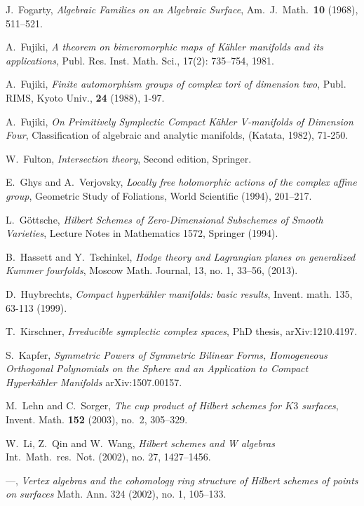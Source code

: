 \begin{thebibliography}{10}
J.~Fogarty, \emph{Algebraic Families on an Algebraic Surface},
  Am.~J.~Math.~\textbf{10} (1968), 511--521.

A.~Fujiki,
\emph{A theorem on bimeromorphic maps of K\"ahler manifolds and its applications},
Publ. Res. Inst. Math. Sci., 
17(2): 735--754, 1981.

A.~Fujiki, \emph{Finite automorphism groups of complex tori of dimension two}, Publ. RIMS,
  Kyoto Univ., \textbf{24} (1988), 1-97.

A.~Fujiki,
\emph{On Primitively Symplectic Compact K\"ahler V-manifolds of Dimension Four},
Classification of algebraic and analytic manifolds, 
(Katata, 1982), 71-250.

W.~Fulton,
\emph{Intersection theory},
Second edition, Springer.

E.~Ghys and A.~Verjovsky, \emph{Locally free holomorphic actions of the complex affine group},
  Geometric Study of Foliations, World Scientific (1994), 201--217.

L.~G\"ottsche, \emph{Hilbert Schemes of Zero-Dimensional Subschemes of Smooth Varieties},
  Lecture Notes in Mathematics 1572, Springer (1994).

B.~Hassett and Y.~Tschinkel, \emph{ Hodge theory and Lagrangian planes on 
  generalized Kummer fourfolds}, Moscow Math. Journal, 13, no. 1, 33--56, (2013).

D.~Huybrechts,
\emph{ Compact hyperk\"ahler manifolds: basic results},
Invent. math. 
135, 63-113 (1999).

T.~Kirschner, 
\emph{Irreducible symplectic complex spaces},
PhD thesis, arXiv:1210.4197.
  
S.~Kapfer, \emph{Symmetric Powers of Symmetric Bilinear Forms, Homogeneous Orthogonal Polynomials 
  on the Sphere and an Application to Compact Hyperk\"ahler Manifolds} arXiv:1507.00157.
  
M.~Lehn and C.~Sorger, \emph{The cup product of Hilbert schemes for {$K3$}
  surfaces}, Invent. Math. \textbf{152} (2003), no.~2, 305--329.

W.~Li, Z.~Qin and W.~Wang, \emph{Hilbert schemes and W algebras} Int.~Math.~res.~Not. (2002),
  no. 27, 1427--1456.

---, \emph{Vertex algebras and the cohomology ring structure of 
  Hilbert schemes of points on surfaces} Math. Ann. 324 (2002), no. 1, 105--133.  
  

\end{thebibliography}
